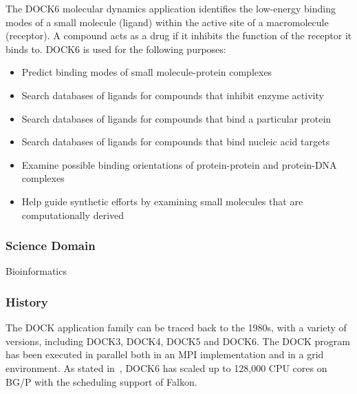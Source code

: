 \documentclass[10pt,letterpaper]{article}
\begin{document}
The DOCK6 molecular dynamics application identifies the low-energy binding modes of a small molecule (ligand) within the active site of a macromolecule (receptor). A compound acts as a drug if it inhibits the function of the receptor it binds to.
DOCK6 is used for the following purposes:
\begin{itemize}
\item Predict binding modes of small molecule-protein complexes
\item Search databases of ligands for compounds that inhibit enzyme activity
\item Search databases of ligands for compounds that bind a particular protein
\item Search databases of ligands for compounds that bind nucleic acid targets
\item Examine possible binding orientations of protein-protein and protein-DNA complexes
\item Help guide synthetic efforts by examining small molecules that are computationally derived
\end{itemize}

\subsubsection{Science Domain} Bioinformatics

\subsubsection{History}
The DOCK application family can be traced back to the 1980s, with a variety of versions, including DOCK3, DOCK4, DOCK5 and DOCK6. The DOCK program has been executed in parallel both in an MPI implementation and in a grid environment. As stated in~\cite{FALKON-SC-08}, DOCK6 has scaled up to 128,000 CPU cores on BG/P with the scheduling support of Falkon.
\end{document}
